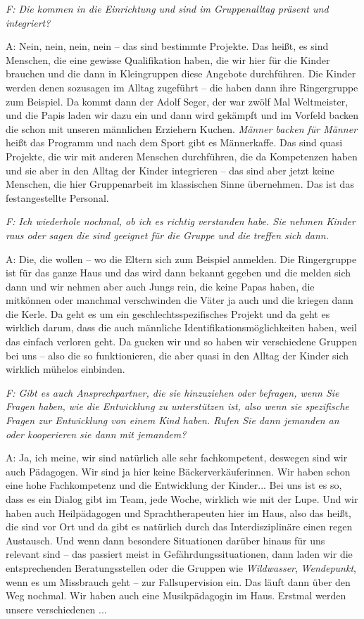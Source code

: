 \begin{linenumbers*}
\emph{F: Die kommen in die Einrichtung und sind im Gruppenalltag präsent und integriert?} 

A: Nein, nein, nein, nein -- das sind bestimmte Projekte.
Das heißt, es sind Menschen, die eine gewisse Qualifikation haben, die wir hier für die Kinder brauchen und die dann in Kleingruppen diese Angebote durchführen. Die Kinder werden denen sozusagen im Alltag zugeführt -- die haben dann ihre Ringergruppe zum Beispiel. Da kommt dann der Adolf Seger, der war zwölf Mal Weltmeister, und die Papis laden wir dazu ein und dann wird gekämpft und im Vorfeld backen die schon mit unseren männlichen Erziehern Kuchen. \emph{Männer backen für Männer} heißt das Programm und nach dem Sport gibt es Männerkaffe. Das sind quasi Projekte, die wir mit anderen Menschen durchführen, die da Kompetenzen haben und sie aber in den Alltag der Kinder integrieren -- das sind aber jetzt keine Menschen, die hier Gruppenarbeit im klassischen Sinne übernehmen. Das ist das festangestellte Personal. 

\emph{F: Ich wiederhole nochmal, ob ich es richtig verstanden habe. Sie nehmen Kinder raus oder sagen die sind geeignet für die Gruppe und die treffen sich dann.}

A: Die, die wollen -- wo die Eltern sich zum Beispiel anmelden. Die Ringergruppe ist für das ganze Haus und das wird dann bekannt gegeben und die melden sich dann und wir nehmen aber auch Jungs rein, die keine Papas haben, die mitkönnen oder manchmal verschwinden die Väter ja auch und die kriegen dann die Kerle. Da geht es um ein geschlechtsspezifisches Projekt und da geht es wirklich darum, dass die auch männliche Identifikationsmöglichkeiten haben, weil das einfach verloren geht. Da gucken wir und so haben wir verschiedene Gruppen bei uns -- also die so funktionieren, die aber quasi in den Alltag der Kinder sich wirklich mühelos einbinden.

\emph{F: Gibt es auch Ansprechpartner, die sie hinzuziehen oder befragen, wenn Sie Fragen haben, wie die Entwicklung zu unterstützen ist, also wenn sie spezifische Fragen zur Entwicklung von einem Kind haben. Rufen Sie dann jemanden an oder kooperieren sie dann mit jemandem?}

A: Ja, ich meine, wir sind natürlich alle sehr fachkompetent, deswegen sind wir auch Pädagogen. Wir sind ja hier keine Bäckerverkäuferinnen. Wir haben schon eine hohe Fachkompetenz und die Entwicklung der Kinder... Bei uns ist es so, dass es ein Dialog gibt im Team, jede Woche, wirklich wie mit der Lupe. Und wir haben auch Heilpädagogen und Sprachtherapeuten hier im Haus, also das heißt, die sind vor Ort und da gibt es natürlich durch das Interdisziplinäre einen regen Austausch. Und wenn dann besondere Situationen darüber hinaus für uns relevant sind -- das passiert meist in Gefährdungssituationen, dann laden wir die entsprechenden Beratungsstellen oder die Gruppen wie \emph{Wildwasser}, \emph{Wendepunkt}, wenn es um Missbrauch geht -- zur Fallsupervision ein. Das läuft dann über den Weg nochmal. Wir haben auch eine Musikpädagogin im Haus. Erstmal werden unsere verschiedenen ...


\end{linenumbers*}
